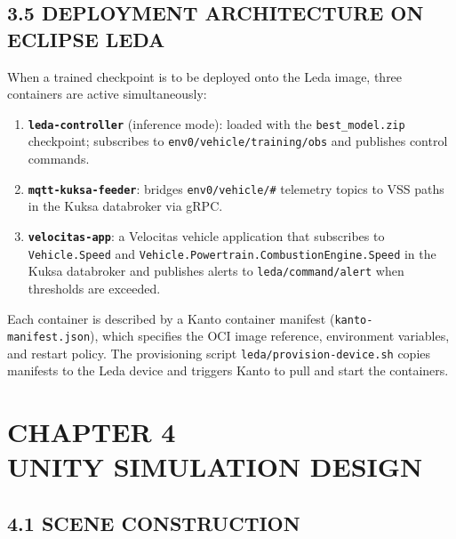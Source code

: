 \documentclass[12pt,a4paper]{article}
\begin{document}
\subsection*{3.5 \quad DEPLOYMENT ARCHITECTURE ON ECLIPSE LEDA}

\indent When a trained checkpoint is to be deployed onto the Leda image, three
containers are active simultaneously:

\begin{enumerate}[leftmargin=2.5cm]
  \item \textbf{\texttt{leda-controller}} (inference mode): loaded with the
    \texttt{best\_model.zip} checkpoint; subscribes to \texttt{env0/vehicle/training/obs}
    and publishes control commands.
  \item \textbf{\texttt{mqtt-kuksa-feeder}}: bridges \texttt{env0/vehicle/\#} telemetry
    topics to VSS paths in the Kuksa databroker via gRPC.
  \item \textbf{\texttt{velocitas-app}}: a Velocitas vehicle application that subscribes
    to \texttt{Vehicle.Speed} and \texttt{Vehicle.Powertrain.CombustionEngine.Speed}
    in the Kuksa databroker and publishes alerts to
    \texttt{leda/command/alert} when thresholds are exceeded.
\end{enumerate}

Each container is described by a Kanto container manifest
(\texttt{kanto-manifest.json}), which specifies the OCI image reference,
environment variables, and restart policy. The provisioning script
\texttt{leda/provision-device.sh} copies manifests to the Leda device and
triggers Kanto to pull and start the containers.

\clearpage

\section*{\centering CHAPTER 4\\[0.3cm] UNITY SIMULATION DESIGN}
\vspace{2\baselineskip}

\subsection*{4.1 \quad SCENE CONSTRUCTION}
\end{document}
